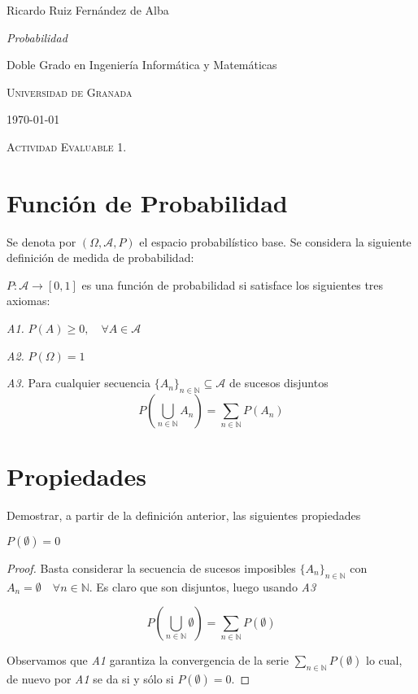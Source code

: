 \documentclass[
  a4paper,
  spanish,
  12pt,
]{scrartcl}
\begin{document}
\begin{flushright}
  Ricardo Ruiz Fernández de Alba\vspace{.5em}

  \textit{Probabilidad}

  Doble Grado en Ingeniería Informática y Matemáticas

  \textsc{Universidad de Granada}\vspace{.5em}

  \today\vspace{.5em}
\end{flushright}

\begin{flushleft}
  \scshape\Large Actividad Evaluable 1.
\end{flushleft}

\section{Función de Probabilidad}

Se denota por $(\Omega, \mathcal{A},P)$ el espacio probabilístico base. Se considera la siguiente definición de medida de probabilidad:

\begin{ndef}
   $P : \mathcal{A} \rightarrow[0,1]$ es una función de probabilidad si satisface los siguientes tres axiomas:

\emph{A1.} $P(A) \geq 0, \quad \forall A \in \mathcal{A}$

\emph{A2.} $P(\Omega) = 1$

\emph{A3.} Para cualquier secuencia $\{A_n\}_{n \in \mathbb{N}} \subseteq \mathcal{A}$ de sucesos disjuntos
$$
P\left(\bigcup_{n\in \mathbb{N}}A_n\right) = \sum_{n \in \mathbb{N}} P(A_n)
$$
\end{ndef}


\section{Propiedades}

Demostrar, a partir de la definición anterior, las siguientes propiedades

\begin{nprop}
    $P(\emptyset) = 0$
\end{nprop}

\begin{proof}

Basta considerar la secuencia de sucesos imposibles $\{ A_n \}_{n \in \mathbb{N}}$ con $A_n = \emptyset \quad \forall n \in \mathbb{N}$. Es claro que son disjuntos, luego usando \emph{A3}

$$
P\left(\bigcup_{n \in \mathbb{N}} \emptyset \right) = \sum_{n \in \mathbb{N}} P(\emptyset)
$$

Observamos que \emph{A1} garantiza la convergencia de la serie $\sum_{n \in \mathbb{N}} P(\emptyset)$ lo cual, de nuevo por \emph{A1} se da si y sólo si $P(\emptyset) = 0$.

\end{proof}
\end{document}
